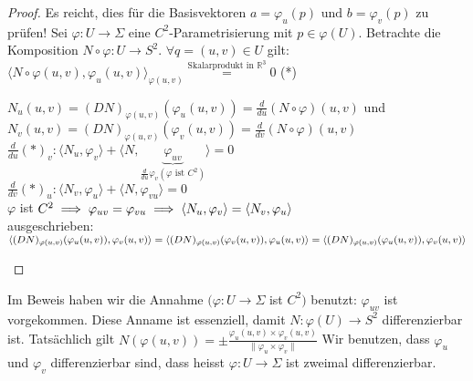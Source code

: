 \documentclass[../main.tex]{subfiles}
\begin{document}
\begin{proof}
    Es reicht, dies für die Basisvektoren $a = \varphi_{u}(p) \text{ und } b = \varphi_{v}(p)$ zu prüfen!
    Sei $\varphi : U \to \Sigma$ eine $C^{2}$-Parametrisierung mit $p\in\varphi(U)$.
    Betrachte die Komposition $N \circ \varphi : U \to S^{2}$.
    $\forall q = (u,v)\in U$ gilt: $\langle N\circ \varphi(u,v), \varphi_{u}(u,v)\rangle_{\varphi(u,v)} \stackrel{\text{Skalarprodukt in }\mathbb{R}^{3}}{=} 0$ (*)
    \begin{notation}
        $N_{u}(u,v) = (DN)_{\varphi(u,v)}(\varphi_{u}(u,v)) = \frac{d}{du}(N\circ\varphi)(u,v)$ und \\
        $N_{v}(u,v) = (DN)_{\varphi(u,v)}(\varphi_{v}(u,v)) = \frac{d}{dv}(N\circ\varphi)(u,v)$ \\
        $\frac{d}{du}(*)_{v} : \langle N_{u}, \varphi_{v} \rangle + \langle N, \underbrace{\varphi_{uv}}_{\frac{d}{du}\varphi_{v}(\varphi \text{ ist } C^{2})}\rangle = 0$\\
        $\frac{d}{dv} (*)_{u} : \langle N_{v}, \varphi_{u} \rangle + \langle N, \varphi_{vu} \rangle = 0$\\
        $\varphi$ ist $C^{2} \implies \varphi_{uv} = \varphi_{vu}\\
        \implies \langle N_{u}, \varphi_{v}\rangle = \langle N_{v}, \varphi_{u}\rangle$ \\ausgeschrieben: $\langle (DN)_{\varphi(u,v)}(\varphi_{u}(u,v)), \varphi_{v}(u,v)\rangle = \langle (DN)_{\varphi(u,v)}(\varphi_{v}(u,v)), \varphi_{u}(u,v)\rangle \\= \langle (DN)_{\varphi(u,v)}(\varphi_{u}(u,v)), \varphi_{v}(u,v)\rangle$
    \end{notation}
\end{proof}
\begin{remark}
    Im Beweis haben wir die Annahme $(\varphi: U \to \Sigma$ ist $C^{2})$ benutzt: $\varphi_{uv}$ ist vorgekommen. 
    Diese Anname ist essenziell, damit $N:\varphi(U) \to S^{2}$ differenzierbar ist. Tatsächlich gilt $N(\varphi(u,v)) = \pm \frac{\varphi_{u}(u,v)\times\varphi_{v}(u,v)}{\|\varphi_u \times \varphi_{v}\|}$ Wir benutzen, dass $\varphi_{u}$ und $\varphi_{v}$ differenzierbar sind, dass heisst $\varphi : U \to \Sigma$ ist zweimal differenzierbar.
\end{remark}
\end{document}
